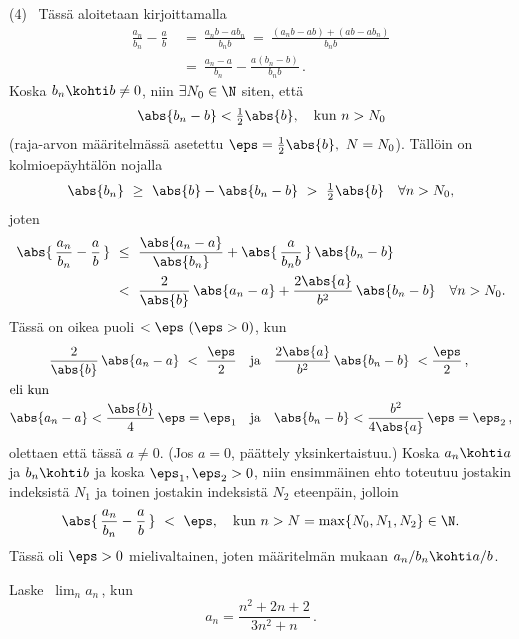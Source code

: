  (4) \ Tässä aloitetaan kirjoittamalla
\begin{align*}
\frac{a_n}{b_n} - \frac{a}{b}\ &=\ \frac{a_n b - a b_n}{b_n b}\
                                =\ \frac{(a_n b - ab) + (ab - ab_n)}{b_n b} \\
                               &=\ \frac{a_n - a}{b_n} - \frac{a(b_n - b)}{b_n b}\,.
\end{align*}
Koska $b_n \kohti b \neq 0$, niin $\exists N_0 \in \N$ siten, että
\[
\abs{b_n - b} < \tfrac{1}{2} \abs{b}, \quad \text{kun}\ n > N_0
\]
(raja-arvon määritelmässä asetettu $\eps = \frac{1}{2} \abs{b},\ N=N_0$). Tällöin on
kolmioepäyhtälön nojalla
\[
\abs{b_n}\ \ge\ \abs{b} - \abs{b_n - b}\ >\ \tfrac{1}{2} \abs{b} \quad \forall n >N_0,
\]
joten
\begin{align*}
\abs{\,\frac{a_n}{b_n} - \frac{a}{b}\,}\ 
         &\le\ \frac{\abs{a_n - a}}{\abs{b_n}} + \abs{\,\frac{a}{b_n b}\,}\,\abs{b_n - b} \\
         &<\ \frac{2}{\abs{b}}\,\abs{a_n - a} + \frac{2 \abs{a}}{b^2}\,\abs{b_n - b} \quad 
                                                                         \forall n > N_0.
\end{align*}
Tässä on oikea puoli $< \eps\ (\eps > 0)$, kun
\begin{align*}
\frac{2}{\abs{b}}\,\abs{a_n - a}\ <\ \frac{\eps}{2} \quad 
        &\text{ja} \quad \frac{2 \abs{a}}{b^2}\,\abs{b_n - b}\ < \frac{\eps}{2}\,, \\
\intertext{eli kun}
\abs{a_n - a} < \frac{\abs{b}}{4}\,\eps = \eps_1 \quad 
        &\text{ja} \quad \abs{b_n - b} < \frac{b^2}{4 \abs{a}}\,\eps = \eps_2\,,
\end{align*}
olettaen että tässä $a \neq 0$. (Jos $a=0$, päättely yksinkertaistuu.) Koska $a_n \kohti a$ ja
$b_n \kohti b$ ja koska $\eps_1, \eps_2 > 0$, niin ensimmäinen ehto toteutuu jostakin indeksistä
$N_1$ ja toinen jostakin indeksistä $N_2$ eteenpäin, jolloin
\[
\abs{\,\frac{a_n}{b_n}-\frac{a}{b}\,}\ <\ \eps, \quad \text{kun}\ n>N = \max\{N_0,N_1,N_2\}\in\N.
\]
Tässä oli $\eps > 0$ mielivaltainen, joten määritelmän mukaan $a_n/b_n \kohti a/b$. \loppu

\begin{Exa} Laske $\ \lim_n a_n\,$, kun
\[
a_n = \frac{n^2+2n+2}{3n^2+n}\,.
\] \end{Exa}

